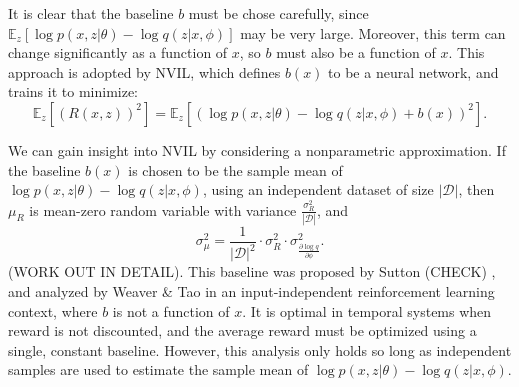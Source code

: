 \documentclass{article} %
\begin{document}
It is clear that the baseline $b$ must be chose carefully, since $\mathbb{E}_z \left[ \log p(x,z | \theta) - \log q(z | x, \phi) \right]$ may be very large.  Moreover, this term can change significantly as a function of $x$, so $b$ must also be a function of $x$.  This approach is adopted by NVIL, which defines $b(x)$ to be a neural network, and trains it to minimize:
\begin{equation*}
\mathbb{E}_z \left[ \left(R(x,z) \right)^2 \right] = \mathbb{E}_z \left[ \left( \log p(x,z | \theta) - \log q(z | x, \phi) + b(x) \right)^2 \right].
\end{equation*}

We can gain insight into NVIL by considering a nonparametric approximation.
If the baseline $b(x)$ is chosen to be the sample mean of $\log p(x,z|\theta) - \log q(z | x, \phi)$, using an independent dataset of size $|\mathcal{D}|$, then $\mu_R$ is mean-zero random variable with variance $\frac{\sigma_R^2}{|\mathcal{D}|}$, and 
\begin{equation*}
\sigma_{\mu}^2 = \frac{1}{|\mathcal{D}|^2} \cdot \sigma_R^2 \cdot \sigma_{\frac{\partial \log q}{\partial \phi}}^2 .
\end{equation*}
(WORK OUT IN DETAIL).  This baseline was proposed by Sutton (CHECK) \cite{sutton1984temporal}, and analyzed by Weaver \& Tao \cite{weaver2001optimal} in an input-independent reinforcement learning context, where $b$ is not a function of $x$.  It is optimal in temporal systems when reward is not discounted, and the average reward must be optimized using a single, constant baseline.  %
However, this analysis only holds so long as independent samples are used to estimate the sample mean of $\log p(x,z|\theta) - \log q(z | x, \phi)$.
\end{document}
